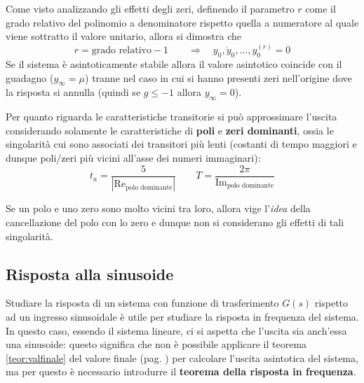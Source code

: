 			Come visto analizzando gli effetti degli zeri, definendo il parametro $r$ come il grado relativo del polinomio a denominatore rispetto quella a numeratore al quale viene sottratto il valore unitario, allora si dimostra che
			\[ r = \textrm{grado relativo} - 1 \qquad \Rightarrow \quad y_0,\dot y_0 ,\dots, y_0^{(r)} = 0 \]
			Se il  sistema è asintoticamente stabile allora il valore asintotico coincide con il guadagno  ($y_\infty = \mu$) tranne nel caso in cui si hanno presenti zeri nell'origine dove la risposta si annulla (quindi se $g\leq -1$ allora $y_\infty = 0$). \\
			\begin{concetto}
				Per quanto riguarda le caratteristiche transitorie si può approssimare l'uscita considerando solamente le caratteristiche di \textbf{poli} e \textbf{zeri dominanti}, ossia le singolarità cui sono associati dei transitori più lenti (costanti di tempo maggiori e dunque poli/zeri più vicini all'asse dei numeri immaginari):
				\[ t_a = \frac{5}{\left|\textrm{Re}_\textrm{polo dominante}\right|} \qquad T = \frac{2\pi}{\textrm{Im}_\textrm{polo dominante}} \]
			\end{concetto}
			\begin{osservazione}
				Se un polo e uno zero sono molto vicini tra loro, allora vige l'\textit{idea} della cancellazione del polo con lo zero e dunque non si considerano gli effetti di tali singolarità.
			\end{osservazione}
			
	\subsection{Risposta alla sinusoide}
		Studiare la risposta di un sistema con funzione di trasferimento $G(s)$ rispetto ad un ingresso sinusoidale è utile per studiare la risposta in frequenza del sistema. In questo caso, essendo il sistema lineare, ci si aspetta che l'uscita sia anch'essa una sinusoide: questo significa che non è possibile applicare il teorema \ref{teor:valfinale} del valore finale (pag. \pageref{teor:valfinale}) per calcolare l'uscita asintotica del sistema, ma per questo è necessario introdurre il \textbf{teorema della risposta in frequenza}.
		
